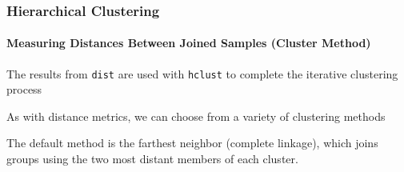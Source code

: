 \documentclass[10pt]{beamer}
\begin{document}
\begin{frame}
\frametitle{Hierarchical Clustering}
\framesubtitle{Measuring Distances Between Joined Samples (Cluster Method)}


\bi
\item The results from {\color{red} \tt dist} are used with
  {\color{red} \tt hclust} to complete the iterative clustering
  process

\item As with distance metrics, we can choose from a variety of
  clustering methods

\item The default method is the {\color{blue} farthest neighbor}
  (complete linkage), which joins groups using the two most distant members of each cluster.

\ei

\begin{center}

\end{center}
\end{frame}
\end{document}
